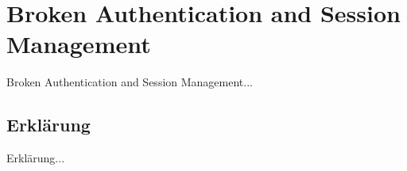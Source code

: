 \chapter{Broken Authentication and Session Management}
\label{BrokenAuthenticationAndSessionManagement}
Broken Authentication and Session Management...

\section{Erklärung}
Erklärung...